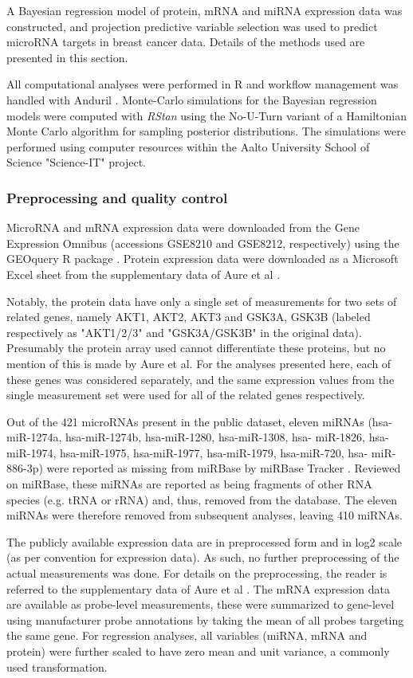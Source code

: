 A Bayesian regression model of protein, mRNA and miRNA expression data was
constructed, and projection predictive variable selection was used to predict
microRNA targets in breast cancer data. Details of the methods used are
presented in this section.

All computational analyses were performed in R
\citep{R} and workflow management was handled with Anduril \citep{Ovaska2010}.
Monte-Carlo simulations for the Bayesian regression models were computed with
\emph{RStan} \citep{RStan} using the No-U-Turn variant of a Hamiltonian Monte Carlo
algorithm for sampling posterior distributions. The simulations were performed using
computer resources within the Aalto University School of Science "Science-IT"
project.


\subsubsection{Preprocessing and quality control}

MicroRNA and mRNA expression data were downloaded from the Gene Expression
Omnibus \citep{Edgar2002} (accessions GSE8210 and GSE8212, respectively) using
the GEOquery R package \citep{GEOquery}. Protein expression data were
downloaded as a Microsoft Excel sheet from the supplementary data of Aure et
al \citep{Aure2015}.

Notably, the protein data have only a single set of measurements for two sets
of related genes, namely AKT1, AKT2, AKT3 and GSK3A, GSK3B (labeled
respectively as "AKT1/2/3" and "GSK3A/GSK3B" in the original data). Presumably
the protein array used cannot differentiate these proteins, but
no mention of this is made by Aure et al. For the analyses presented here,
each of these genes was considered separately, and the same expression values
from the single measurement set were used for all of the related genes
respectively.

Out of the 421 microRNAs present in the public dataset, eleven miRNAs (hsa-
miR-1274a, hsa-miR-1274b, hsa-miR-1280, hsa-miR-1308, hsa- miR-1826, hsa-
miR-1974, hsa-miR-1975, hsa-miR-1977, hsa-miR-1979, hsa-miR-720, hsa-
miR-886-3p) were reported as missing from miRBase by miRBase Tracker \citep{VanPeer2014}.
Reviewed on miRBase, these miRNAs are reported as being fragments of other RNA species
(e.g. tRNA or rRNA) and, thus, removed from the database. The eleven miRNAs
were therefore removed from subsequent analyses, leaving 410 miRNAs.

The publicly available expression data are in preprocessed form and 
in log2 scale (as per convention for expression data). As such,
no further preprocessing of the actual measurements was done. For details on
the preprocessing, the reader is referred to the supplementary data of Aure et
al \citep{Aure2015}. The mRNA expression data are available as probe-level
measurements, these were summarized to gene-level using manufacturer probe
annotations by taking the mean of all probes targeting the same gene.
For regression analyses, all variables (miRNA, mRNA
and protein) were further scaled to have zero mean and unit variance,
a commonly used transformation.

